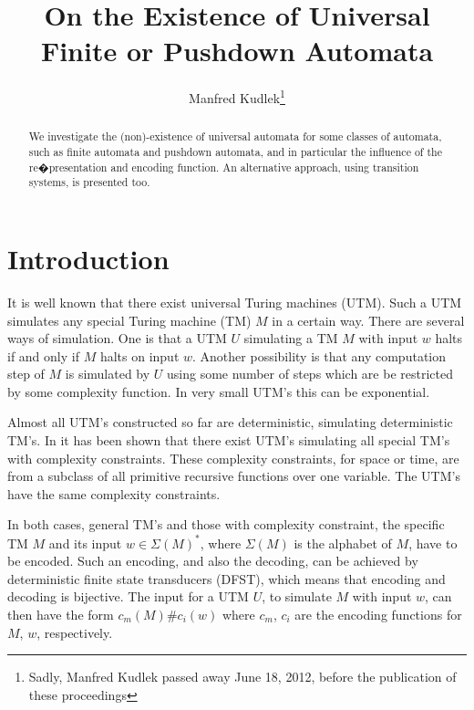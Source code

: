 \documentclass{eptcs}
\begin{document}
\title{On the Existence of Universal Finite or Pushdown Automata
}
\def\titlerunning{On the Existence of Universal Finite and Pushdown Automata}
\author{Manfred Kudlek\footnote{
Sadly, Manfred Kudlek passed away June 18, 2012, before the publication of these proceedings}
}
\def\authorrunning{Kudlek}
\date{}
\maketitle



\begin{abstract}
We investigate the (non)-existence of universal automata for some classes
of automata, such as finite automata and pushdown automata, and
 in particular the influence of the re�presentation and encoding function.
An alternative approach, using transition systems, is presented too.
\end{abstract}

\section{Introduction}

It is well known that there exist universal Turing machines (UTM).
Such a UTM simulates any special Turing machine (TM) $M$ in a certain
way. There are several ways of simulation. One is that a UTM $U$ 
simulating a TM $M$ with input $w$ halts if and only if $M$ halts
on input $w$. Another possibility is that any computation step of $M$
is simulated by $U$ using some number of steps which are be restricted
by some complexity function. In very small UTM's this can be
exponential.

Almost all UTM's constructed so far are deterministic, simulating
deterministic TM's. In \cite{KM} it has been shown that there exist UTM's simulating
all special TM's with complexity constraints. These complexity constraints,
for space or time, are from a subclass of all primitive recursive functions
over one variable. The UTM's have the same complexity constraints.

In both cases, general TM's and those with complexity constraint,
the specific TM $M$ and its input $w\in\Sigma(M)^*$, where $\Sigma(M)$ is
the alphabet of $M$, have to be encoded. Such an encoding, and also the
decoding, can be achieved by deterministic finite state transducers (DFST),
which means that encoding and decoding is bijective. The input for a
UTM $U$, to simulate $M$ with input $w$, can then have the form
$c_m(M){\#}c_i(w)$ where $c_m$, $c_i$ are the encoding functions for $M$, $w$,
respectively.
\end{document}
